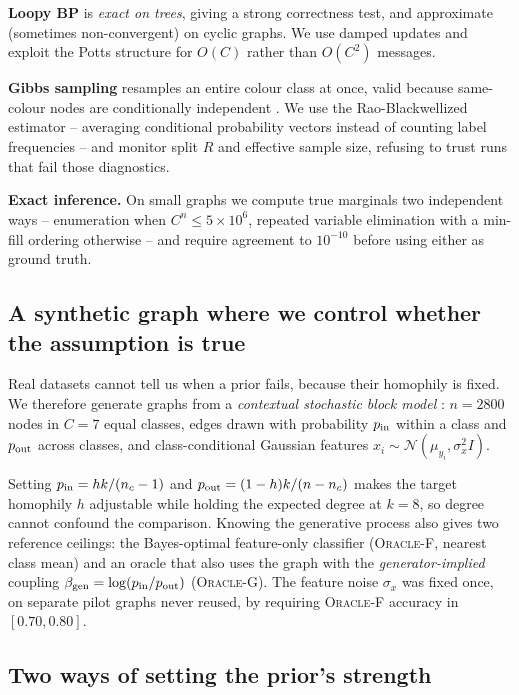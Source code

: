 \documentclass{article}
\begin{document}
\textbf{Loopy BP} is \emph{exact on trees}, giving a strong correctness test, and approximate
(sometimes non-convergent) on cyclic graphs. We use damped updates and exploit the Potts
structure for $O(C)$ rather than $O(C^2)$ messages.

\textbf{Gibbs sampling} resamples an entire colour class at once, valid because same-colour
nodes are conditionally independent \citep{gonzalez2011parallel}. We use the Rao-Blackwellized
estimator -- averaging conditional probability vectors instead of counting label frequencies --
and monitor split $\hat{R}$ and effective sample size, refusing to trust runs that fail those
diagnostics.

\textbf{Exact inference.} On small graphs we compute true marginals two independent ways --
enumeration when $C^n\le5\times10^6$, repeated variable elimination with a min-fill ordering
otherwise -- and require agreement to $10^{-10}$ before using either as ground truth.

\subsection{A synthetic graph where we control whether the assumption is true}
\label{sec:csbm}

Real datasets cannot tell us when a prior fails, because their homophily is fixed. We therefore
generate graphs from a \emph{contextual stochastic block model} \citep{deshpande2018contextual}:
$n=2800$ nodes in $C=7$ equal classes, edges drawn with probability $p_{\rm in}$ within a class
and $p_{\rm out}$ across classes, and class-conditional Gaussian features
$x_i\sim\mathcal{N}(\mu_{y_i},\sigma_x^2 I)$.

Setting $p_{\rm in}=hk/(n_c-1)$ and $p_{\rm out}=(1-h)k/(n-n_c)$ makes the target homophily $h$
adjustable while holding the expected degree at $k=8$, so degree cannot confound the comparison.
Knowing the generative process also gives two reference ceilings: the Bayes-optimal feature-only
classifier (\textsc{Oracle-F}, nearest class mean) and an oracle that also uses the graph with
the \emph{generator-implied} coupling $\beta_{\rm gen}=\log(p_{\rm in}/p_{\rm out})$
(\textsc{Oracle-G}). The feature noise $\sigma_x$ was fixed once, on separate pilot graphs never
reused, by requiring \textsc{Oracle-F} accuracy in $[0.70,0.80]$.

\subsection{Two ways of setting the prior's strength}
\end{document}
